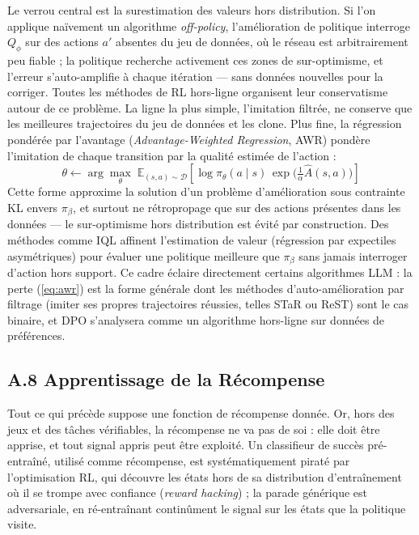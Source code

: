 \documentclass[11pt,a4paper]{article}
\begin{document}
Le verrou central est la surestimation des valeurs hors distribution. Si l'on applique naïvement un algorithme \emph{off-policy}, l'amélioration de politique interroge $Q_\phi$ sur des actions $a'$ absentes du jeu de données, où le réseau est arbitrairement peu fiable ; la politique recherche activement ces zones de sur-optimisme, et l'erreur s'auto-amplifie à chaque itération — sans données nouvelles pour la corriger. Toutes les méthodes de RL hors-ligne organisent leur conservatisme autour de ce problème. La ligne la plus simple, l'imitation filtrée, ne conserve que les meilleures trajectoires du jeu de données et les clone. Plus fine, la régression pondérée par l'avantage (\emph{Advantage-Weighted Regression}, AWR) pondère l'imitation de chaque transition par la qualité estimée de l'action :
\begin{equation}
\theta \leftarrow \arg\max_\theta \; \mathbb{E}_{(s,a) \sim \mathcal{D}} \left[ \log \pi_\theta(a \mid s) \, \exp\big( \tfrac{1}{\alpha} \hat{A}(s, a) \big) \right]
\label{eq:awr}
\end{equation}
Cette forme approxime la solution d'un problème d'amélioration sous contrainte KL envers $\pi_\beta$, et surtout ne rétropropage que sur des actions présentes dans les données — le sur-optimisme hors distribution est évité par construction. Des méthodes comme IQL affinent l'estimation de valeur (régression par expectiles asymétriques) pour évaluer une politique meilleure que $\pi_\beta$ sans jamais interroger d'action hors support. Ce cadre éclaire directement certains algorithmes LLM : la perte (\ref{eq:awr}) est la forme générale dont les méthodes d'auto-amélioration par filtrage (imiter ses propres trajectoires réussies, telles STaR ou ReST) sont le cas binaire, et DPO s'analysera comme un algorithme hors-ligne sur données de préférences.

\subsection*{A.8 Apprentissage de la Récompense}
Tout ce qui précède suppose une fonction de récompense donnée. Or, hors des jeux et des tâches vérifiables, la récompense ne va pas de soi : elle doit être apprise, et tout signal appris peut être exploité. Un classifieur de succès pré-entraîné, utilisé comme récompense, est systématiquement piraté par l'optimisation RL, qui découvre les états hors de sa distribution d'entraînement où il se trompe avec confiance (\emph{reward hacking}) ; la parade générique est adversariale, en ré-entraînant continûment le signal sur les états que la politique visite.
\end{document}
